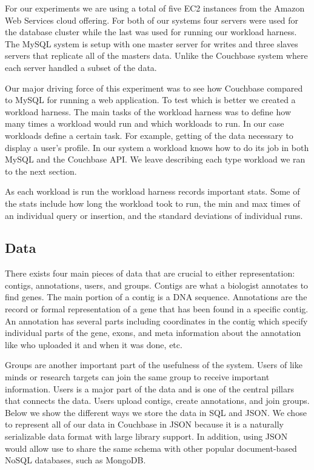 \documentclass[]{IEEEtran}
\begin{document}
For our experiments we are using a total of five EC2 instances from the Amazon
Web Services cloud offering. For both of our systems four servers were used for the
database cluster while the last was used for running our workload harness. The MySQL
system is setup with one master server for writes and three slaves servers that
replicate all of the masters data. Unlike the Couchbase system where each
server handled a subset of the data.

Our major driving force of this experiment was to see how Couchbase compared to
MySQL for running a web application. To test which is better we created a
workload harness. The main tasks of the workload harness was to define how many
times a workload would run and which workloads to run. In our case workloads
define a certain task. For example, getting of the data necessary to display a
user's profile. In our system a workload knows how to do its job in both MySQL
and the Couchbase API. We leave describing each type workload we ran to the
next section.

As each workload is run the workload harness records important stats. Some of
the stats include how long the workload took to run, the min and max times of
an individual query or insertion, and the standard deviations of individual
runs.

\subsection{Data}
There exists four main pieces of data that are crucial to either
representation: contigs, annotations, users, and groups. Contigs are
what a biologist annotates to find genes. The main portion of a contig is a DNA
sequence. Annotations are the record or formal representation of a gene that
has been found in a specific contig. An annotation has several parts including
coordinates in the contig which specify individual parts of the gene, exons, and meta information
about the annotation like who uploaded it and when it was done, etc.

Groups are another important part of the usefulness of the system. Users of
like minds or research targets can join the same group to receive important information. Users is a
major part of the data and is one of the central pillars that connects the
data. Users upload contigs, create annotations, and join groups. Below we show
the different ways we store the data in SQL and JSON. We chose to represent all of our
data in Couchbase in JSON because it is a naturally serializable data format with
large library support. In addition, using JSON would allow use to share the same
schema with other popular document-based NoSQL databases, such as MongoDB.
\end{document}
